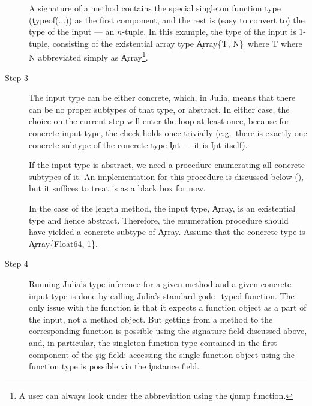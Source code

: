 \begin{description}
  A signature of a method %
  contains the special singleton function
  type (\c{typeof(...)}) as the first component, and the rest is (easy to
  convert to) the type of the input --- an $n$-tuple. In this example, the type of
  the input is 1-tuple, consisting of the existential array type
  \c{Array\{T, N\}\ where T where N} abbreviated simply as \c{Array}\footnote{%
A user can always look under the abbreviation using the \c{dump} function.
}.

  \item[Step 3] The input type can be either concrete, which, in Julia, means that there can
  be no proper subtypes of that type, or abstract. In either case, the choice on the
  current step will enter the loop at least once, because for concrete input type,
  the check holds once trivially (e.g.\ there is exactly one concrete
  subtype of the concrete type \c{Int} --- it is \c{Int} itself).

  If the input type is abstract, we need a procedure enumerating all concrete
  subtypes of it. An implementation for this procedure is discussed below
  (), but it suffices to
  treat is as a black box for now.

  In the case of the \c{length} method, the input type, \c{Array}, is
  an existential type and hence abstract. Therefore, the enumeration procedure
  should have yielded a concrete subtype of \c{Array}. Assume that
  the concrete type is \c{Array\{Float64, 1\}}.

  \item[Step 4] Running Julia's type inference for a given method and a given concrete input
  type is done by calling Julia's standard \c{code\_typed} function.
  The only issue with the function is that it expects a function object as a
  part of the input, not a method object. But getting from a method to the
  corresponding function is possible using the signature field discussed above,
  and, in particular, the singleton function type contained in the first component
  of the \c{sig} field: accessing the single function object using the function
  type is possible via the \c{instance} field.


\end{description}
